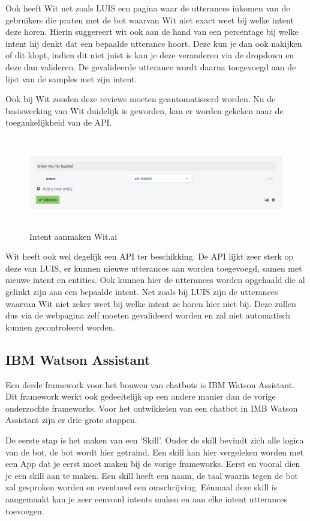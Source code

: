 Ook heeft Wit net zoals LUIS een pagina waar de utterances inkomen van de gebruikers die praten met de bot waarvan Wit niet exact weet bij welke intent deze horen. Hierin suggereert wit ook aan de hand van een percentage bij welke intent hij denkt dat een bepaalde utterance hoort. Deze kun je dan ook nakijken of dit klopt, indien dit niet juist is kan je deze veranderen via de dropdown en deze dan valideren. De gevalideerde utterance wordt daarna toegevoegd aan de lijst van de samples met zijn intent.

Ook bij Wit zouden deze reviews moeten geautomatiseerd worden. Nu de basiswerking van Wit duidelijk is geworden, kan er worden gekeken naar de toegankelijkheid van de API. 

\begin{figure}[h!]
	\centering
	\includegraphics[height=4cm]{img/inbox.png}
	\caption{Intent aanmaken Wit.ai}
	\label{fig:inbox}
\end{figure}

Wit heeft ook wel degelijk een API ter beschikking. De API lijkt zeer sterk op deze van LUIS, er kunnen nieuwe utterances aan worden toegevoegd, samen met nieuwe intent en entities. Ook kunnen hier de utterances worden opgehaald die al gelinkt zijn aan een bepaalde intent. Net zoals bij LUIS zijn de utterances waarvan Wit niet zeker weet bij welke intent ze horen hier niet bij. Deze zullen dus via de webpagina zelf moeten gevalideerd worden en zal niet automatisch kunnen gecontroleerd worden.

\subsection{IBM Watson Assistant}
\label{watson}

Een derde framework voor het bouwen van chatbots is IBM Watson Assistant. Dit framework werkt ook gedeeltelijk op een andere manier dan de vorige onderzochte frameworks. Voor het ontwikkelen van een chatbot in IMB Watson Assistant zijn er drie grote stappen.

De eerste stap is het maken van een 'Skill'. Onder de skill bevindt zich alle logica van de bot, de bot wordt hier getraind. Een skill kan hier vergeleken worden met een App dat je eerst moet maken bij de vorige frameworks. Eerst en vooral dien je een skill aan te maken. Een skill heeft een naam, de taal waarin tegen de bot zal gesproken worden en eventueel een omschrijving. Eénmaal  deze skill is aangemaakt kan je zeer eenvoud intents maken en aan elke intent utterances toevoegen.

